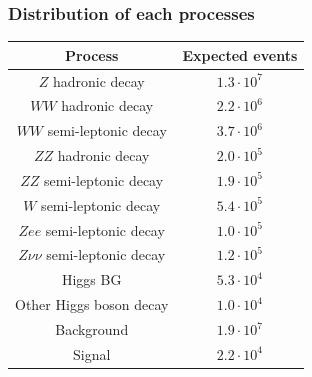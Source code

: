 \documentclass{beamer}
\begin{document}
\begin{frame}
  \frametitle{Distribution of each processes}

  \begin{center}
    \footnotesize{
      \begin{tabular}{c c}
        \hline
         Process        &  Expected events   \tabularnewline
        \hline
        \hline
        $Z$ hadronic decay            & $1.3 \cdot 10^{7}$ \tabularnewline
        $WW$ hadronic decay           & $2.2 \cdot 10^{6}$ \tabularnewline
        $WW$ semi-leptonic decay      & $3.7 \cdot 10^{6}$ \tabularnewline
        $ZZ$ hadronic decay           & $2.0 \cdot 10^{5}$ \tabularnewline
        $ZZ$ semi-leptonic decay      & $1.9 \cdot 10^{5}$ \tabularnewline
        $W$ semi-leptonic decay       & $5.4 \cdot 10^{5}$ \tabularnewline
        $Zee$ semi-leptonic decay     & $1.0 \cdot 10^{5}$ \tabularnewline
        $Z\nu\nu$ semi-leptonic decay & $1.2 \cdot 10^{5}$ \tabularnewline
        Higgs BG                      & $5.3 \cdot 10^{4}$ \tabularnewline
        Other Higgs boson decay       & $1.0 \cdot 10^{4}$ \tabularnewline
        \hline
        Background                    & $1.9 \cdot 10^{7}$ \tabularnewline
        Signal                        & $2.2 \cdot 10^{4}$ \tabularnewline
        \hline
      \end{tabular}
    }   
  \end{center}
\end{frame}
\end{document}
